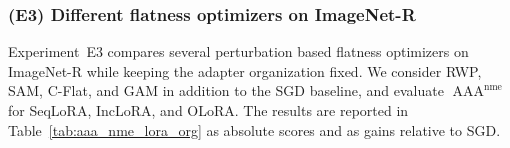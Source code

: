 \documentclass[10pt]{article} %
\begin{document}





\subsubsection{(E3) Different flatness optimizers on ImageNet-R}

Experiment~E3 compares several perturbation based flatness optimizers on ImageNet-R while keeping the adapter organization fixed. We consider RWP, SAM, C-Flat, and GAM in addition to the SGD baseline, and evaluate $\operatorname{AAA}^{\mathrm{nme}}$ for SeqLoRA, IncLoRA, and OLoRA. The results are reported in Table~\ref{tab:aaa_nme_lora_org} as absolute scores and as gains relative to SGD.
\end{document}
